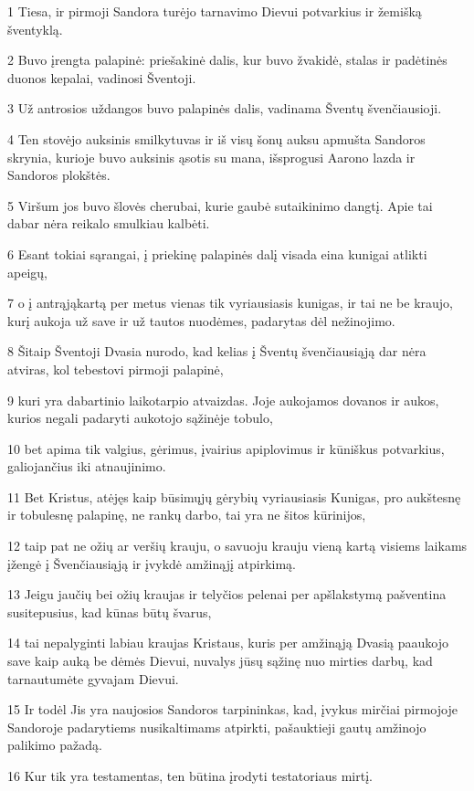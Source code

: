 \par 1 Tiesa, ir pirmoji Sandora turėjo tarnavimo Dievui potvarkius ir žemišką šventyklą. 
\par 2 Buvo įrengta palapinė: priešakinė dalis, kur buvo žvakidė, stalas ir padėtinės duonos kepalai, vadinosi Šventoji. 
\par 3 Už antrosios uždangos buvo palapinės dalis, vadinama Šventų švenčiausioji. 
\par 4 Ten stovėjo auksinis smilkytuvas ir iš visų šonų auksu apmušta Sandoros skrynia, kurioje buvo auksinis ąsotis su mana, išsprogusi Aarono lazda ir Sandoros plokštės. 
\par 5 Viršum jos buvo šlovės cherubai, kurie gaubė sutaikinimo dangtį. Apie tai dabar nėra reikalo smulkiau kalbėti. 
\par 6 Esant tokiai sąrangai, į priekinę palapinės dalį visada eina kunigai atlikti apeigų, 
\par 7 o į antrąją­kartą per metus vienas tik vyriausiasis kunigas, ir tai ne be kraujo, kurį aukoja už save ir už tautos nuodėmes, padarytas dėl nežinojimo. 
\par 8 Šitaip Šventoji Dvasia nurodo, kad kelias į Šventų švenčiausiąją dar nėra atviras, kol tebestovi pirmoji palapinė, 
\par 9 kuri yra dabartinio laikotarpio atvaizdas. Joje aukojamos dovanos ir aukos, kurios negali padaryti aukotojo sąžinėje tobulo, 
\par 10 bet apima tik valgius, gėrimus, įvairius apiplovimus ir kūniškus potvarkius, galiojančius iki atnaujinimo. 
\par 11 Bet Kristus, atėjęs kaip būsimųjų gėrybių vyriausiasis Kunigas, pro aukštesnę ir tobulesnę palapinę, ne rankų darbo, tai yra ne šitos kūrinijos, 
\par 12 taip pat ne ožių ar veršių krauju, o savuoju krauju vieną kartą visiems laikams įžengė į Švenčiausiąją ir įvykdė amžinąjį atpirkimą. 
\par 13 Jeigu jaučių bei ožių kraujas ir telyčios pelenai per apšlakstymą pašventina susitepusius, kad kūnas būtų švarus, 
\par 14 tai nepalyginti labiau kraujas Kristaus, kuris per amžinąją Dvasią paaukojo save kaip auką be dėmės Dievui, nuvalys jūsų sąžinę nuo mirties darbų, kad tarnautumėte gyvajam Dievui. 
\par 15 Ir todėl Jis yra naujosios Sandoros tarpininkas, kad, įvykus mirčiai pirmojoje Sandoroje padarytiems nusikaltimams atpirkti, pašauktieji gautų amžinojo palikimo pažadą. 
\par 16 Kur tik yra testamentas, ten būtina įrodyti testatoriaus mirtį. 
